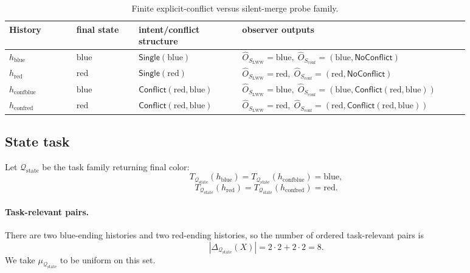 \documentclass[11pt,twoside]{article}
\newcommand{\TableHeaderRow}{\rowcolor{tableheaderbg}\bfseries}
\theoremstyle{definition}
\newcommand{\blue}{\mathrm{blue}}
\newcommand{\red}{\mathrm{red}}
\newcommand{\conf}{\mathrm{conf}}
\begin{document}
\begin{table}[t]
\centering
\small
\begin{tabular}{>{\raggedright\arraybackslash}p{0.13\linewidth} >{\centering\arraybackslash}p{0.12\linewidth} >{\raggedright\arraybackslash}p{0.20\linewidth} >{\raggedright\arraybackslash}p{0.43\linewidth}}
\toprule
\TableHeaderRow
History & final state & intent/conflict structure & observer outputs \\
\midrule
\(h_{\blue}\) & \(\blue\) &
\(\mathsf{Single}(\blue)\) &
\(\widehat{O}_{S_{\mathrm{LWW}}}=\blue,\; \widehat{O}_{S_{\mathrm{conf}}}=(\blue,\mathsf{NoConflict})\) \\[2pt]

\(h_{\red}\) & \(\red\) &
\(\mathsf{Single}(\red)\) &
\(\widehat{O}_{S_{\mathrm{LWW}}}=\red,\; \widehat{O}_{S_{\mathrm{conf}}}=(\red,\mathsf{NoConflict})\) \\[2pt]

\(h_{\conf\blue}\) & \(\blue\) &
\(\mathsf{Conflict}(\red,\blue)\) &
\(\widehat{O}_{S_{\mathrm{LWW}}}=\blue,\; \widehat{O}_{S_{\mathrm{conf}}}=(\blue,\mathsf{Conflict}(\red,\blue))\) \\[2pt]

\(h_{\conf\red}\) & \(\red\) &
\(\mathsf{Conflict}(\red,\blue)\) &
\(\widehat{O}_{S_{\mathrm{LWW}}}=\red,\; \widehat{O}_{S_{\mathrm{conf}}}=(\red,\mathsf{Conflict}(\red,\blue))\) \\
\bottomrule
\end{tabular}
\caption{Finite explicit-conflict versus silent-merge probe family.}
\label{tab:conflict-probe}
\end{table}

\subsection{State task}
\label{app:conflict-state-task}

Let \(\mathcal{Q}_{\mathrm{state}}\) be the task family returning final color:
\[
  T_{\mathcal{Q}_{\mathrm{state}}}(h_{\blue})
  =
  T_{\mathcal{Q}_{\mathrm{state}}}(h_{\conf\blue})
  = \blue,
\]
\[
  T_{\mathcal{Q}_{\mathrm{state}}}(h_{\red})
  =
  T_{\mathcal{Q}_{\mathrm{state}}}(h_{\conf\red})
  = \red.
\]

\paragraph{Task-relevant pairs.}
There are two blue-ending histories and two red-ending histories, so the number of ordered task-relevant pairs is
\[
  |\Delta_{\mathcal{Q}_{\mathrm{state}}}(X)|
  =
  2\cdot 2 + 2\cdot 2
  =
  8.
\]
We take \(\mu_{\mathcal{Q}_{\mathrm{state}}}\) to be uniform on this set.
\end{document}
